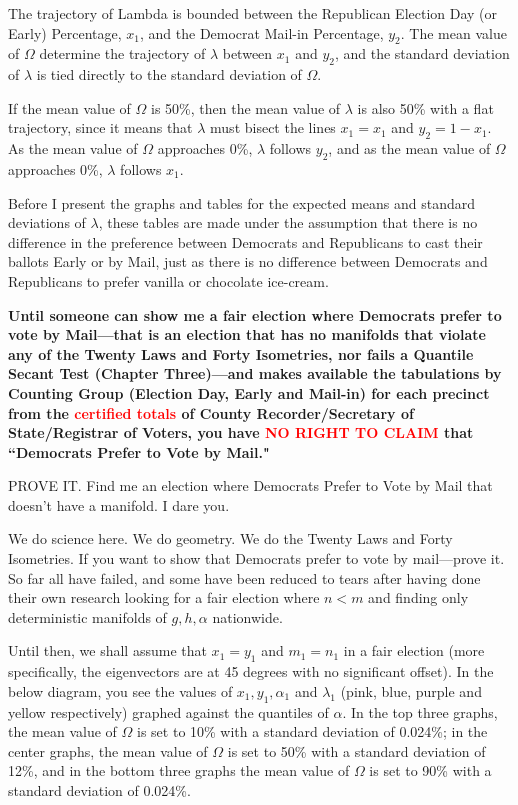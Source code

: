 The trajectory of Lambda is bounded between the Republican Election Day (or Early) Percentage, $x_{1}$, and the Democrat Mail-in Percentage, $y_{2}$. The mean value of $\Omega$ determine the trajectory of $\lambda$ between $x_{1}$ and $y_{2}$, and the standard deviation of $\lambda$ is tied directly to the standard deviation of $\Omega$.  

If the mean value of $\Omega$ is 50\%, then the mean value of $\lambda$ is also 50\% with a flat trajectory, since it means that $\lambda$ must bisect the lines $x_{1}=x_{1}$ and $y_{2}=1-x_{1}$. As the mean value of $\Omega$ approaches 0\%, $\lambda$ follows $y_{2}$, and as the mean value of $\Omega$ approaches 0\%, $\lambda$ follows $x_{1}$.

Before I present the graphs and tables for the expected means and standard deviations of $\lambda$, these tables are made under the assumption that there is no difference in the preference between Democrats and Republicans to cast their ballots Early or by Mail, just as there is no difference between Democrats and Republicans to prefer vanilla or chocolate ice-cream.

\textbf{Until someone can show me a fair election where Democrats prefer to vote by Mail---that is an election that has no manifolds that violate any of the Twenty Laws and Forty Isometries, nor fails a Quantile Secant Test (Chapter Three)---and makes available the tabulations by Counting Group (Election Day, Early and Mail-in) for each precinct from the \textcolor{red}{certified totals} of County Recorder/Secretary of State/Registrar of Voters, you have \textcolor{red}{NO RIGHT TO CLAIM} that ``Democrats Prefer to Vote by Mail."}

PROVE IT. Find me an election where Democrats Prefer to Vote by Mail that doesn't have a manifold. I dare you.

We do science here. We do geometry. We do the Twenty Laws and Forty Isometries. If you want to show that Democrats prefer to vote by mail---prove it. So far all have failed, and some have been reduced to tears after having done their own research looking for a fair election where $n<m$ and finding only deterministic manifolds of $g,h,\alpha$ nationwide.

Until then, we shall assume that $x_{1}=y_{1}$ and $m_{1}=n_{1}$ in a fair election (more specifically, the eigenvectors are at 45 degrees with no significant offset).
\newpage
In the below diagram, you see the values of $x_{1}, y_{1},\alpha_{1}$ and $\lambda_{1}$ (pink, blue, purple and yellow respectively) graphed against the quantiles of $\alpha$. In the top three graphs, the mean value of $\Omega$ is set to 10\% with a standard deviation of 0.024\%; in the center graphs, the mean value of $\Omega$ is set to 50\% with a standard deviation of 12\%, and in the bottom three graphs the mean value of $\Omega$ is set to 90\% with a standard deviation of 0.024\%. 

